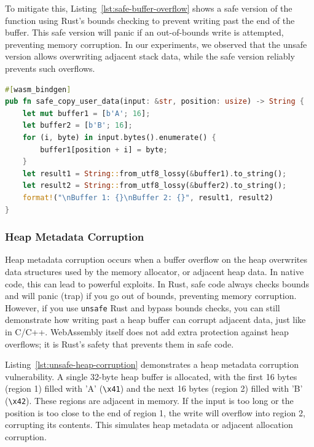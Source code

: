 \documentclass{article}
\begin{document}
To mitigate this, Listing~\ref{lst:safe-buffer-overflow} shows a safe version of the function using Rust's bounds checking to prevent writing past the end of the buffer. This safe version will panic if an out-of-bounds write is attempted, preventing memory corruption. In our experiments, we observed that the unsafe version allows overwriting adjacent stack data, while the safe version reliably prevents such overflows.

\begin{lstlisting}[language=rust, float, caption={Safe buffer copy in Rust}, label={lst:safe-buffer-overflow}]
#[wasm_bindgen]
pub fn safe_copy_user_data(input: &str, position: usize) -> String {
    let mut buffer1 = [b'A'; 16];
    let buffer2 = [b'B'; 16];
    for (i, byte) in input.bytes().enumerate() {
        buffer1[position + i] = byte;
    }
    let result1 = String::from_utf8_lossy(&buffer1).to_string();
    let result2 = String::from_utf8_lossy(&buffer2).to_string();
    format!("\nBuffer 1: {}\nBuffer 2: {}", result1, result2)
}
\end{lstlisting}

\subsubsection{Heap Metadata Corruption}
Heap metadata corruption occurs when a buffer overflow on the heap overwrites data structures used by the memory allocator, or adjacent heap data. In native code, this can lead to powerful exploits. In Rust, safe code always checks bounds and will panic (trap) if you go out of bounds, preventing memory corruption. However, if you use \texttt{unsafe} Rust and bypass bounds checks, you can still demonstrate how writing past a heap buffer can corrupt adjacent data, just like in C/C++. WebAssembly itself does not add extra protection against heap overflows; it is Rust's safety that prevents them in safe code.

Listing~\ref{lst:unsafe-heap-corruption} demonstrates a heap metadata corruption vulnerability. A single 32-byte heap buffer is allocated, with the first 16 bytes (region 1) filled with 'A' (\texttt{\textbackslash x41}) and the next 16 bytes (region 2) filled with 'B' (\texttt{\textbackslash x42}). These regions are adjacent in memory. If the input is too long or the position is too close to the end of region 1, the write will overflow into region 2, corrupting its contents. This simulates heap metadata or adjacent allocation corruption.
\end{document}
